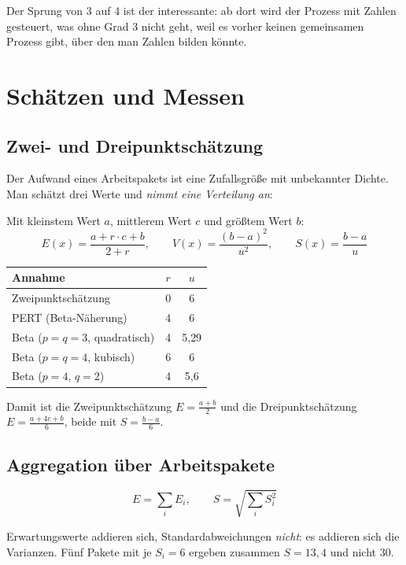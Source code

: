 \documentclass[12pt, a4paper]{article}
\begin{document}
Der Sprung von 3 auf 4 ist der interessante: ab dort wird der Prozess mit Zahlen
gesteuert, was ohne Grad 3 nicht geht, weil es vorher keinen gemeinsamen Prozess
gibt, über den man Zahlen bilden könnte.

\section{Schätzen und Messen}

\subsection{Zwei- und Dreipunktschätzung}

Der Aufwand eines Arbeitspakets ist eine Zufallsgröße mit unbekannter Dichte. Man
schätzt drei Werte und \emph{nimmt eine Verteilung an}:

\begin{definitionbox}
Mit kleinstem Wert $a$, mittlerem Wert $c$ und größtem Wert $b$:
\[
E(x) = \frac{a + r\cdot c + b}{2 + r}, \qquad
V(x) = \frac{(b-a)^2}{u^2}, \qquad
S(x) = \frac{b-a}{u}
\]
\end{definitionbox}

\begin{center}
\begin{tabular}{lcc}
\hline
\textbf{Annahme} & $r$ & $u$ \\
\hline
Zweipunktschätzung & 0 & 6 \\
PERT (Beta-Näherung) & 4 & 6 \\
Beta ($p=q=3$, quadratisch) & 4 & 5{,}29 \\
Beta ($p=q=4$, kubisch) & 6 & 6 \\
Beta ($p=4$, $q=2$) & 4 & 5{,}6 \\
\hline
\end{tabular}
\end{center}

Damit ist die Zweipunktschätzung $E = \frac{a+b}{2}$ und die Dreipunktschätzung
$E = \frac{a + 4c + b}{6}$, beide mit $S = \frac{b-a}{6}$.

\subsection{Aggregation über Arbeitspakete}

\[
E = \sum_i E_i, \qquad S = \sqrt{\sum_i S_i^2}
\]

Erwartungswerte addieren sich, Standardabweichungen \emph{nicht}: es addieren sich die
Varianzen. Fünf Pakete mit je $S_i = 6$ ergeben zusammen $S = 13{,}4$ und nicht $30$.
\end{document}
